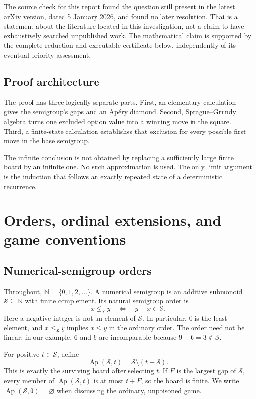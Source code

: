 \documentclass[11pt,letterpaper]{article}
\numberwithin{equation}{section}
\theoremstyle{definition}
\newcommand{\N}{\mathbb N}
\newcommand{\Sg}{\mathcal S}
\newcommand{\Ap}{\operatorname{Ap}}
\begin{document}
The source check for this report found the question still present in the
latest arXiv version, dated 5 January 2026, and found no later resolution.
That is a statement about the literature located in this investigation,
not a claim to have exhaustively searched unpublished work. The mathematical
claim is supported by the complete reduction and executable certificate
below, independently of its eventual priority assessment.

\subsection{Proof architecture}

The proof has three logically separate parts. First, an elementary
calculation gives the semigroup's gaps and an Ap\'ery diamond. Second,
Sprague--Grundy algebra turns one excluded option value into a winning move
in the square. Third, a finite-state calculation establishes that exclusion
for every possible first move in the base semigroup.

The infinite conclusion is not obtained by replacing a sufficiently large
finite board by an infinite one. No such approximation is used. The only
limit argument is the induction that follows an exactly repeated state of
a deterministic recurrence.

\section{Orders, ordinal extensions, and game conventions}
\label{sec:objects}

\subsection{Numerical-semigroup orders}

Throughout, $\N=\{0,1,2,\ldots\}$. A numerical semigroup is an additive
submonoid $\Sg\subseteq\N$ with finite complement. Its natural semigroup
order is
\begin{equation}\label{eq:semigroup-order}
 x\leq_{\Sg}y\quad\Longleftrightarrow\quad y-x\in\Sg.
\end{equation}
Here a negative integer is not an element of $\Sg$. In particular, $0$ is the
least element, and $x\leq_{\Sg}y$ implies $x\leq y$ in the ordinary order.
The order need not be linear: in our example, $6$ and $9$ are incomparable
because $9-6=3\notin\Sg$.

For positive $t\in\Sg$, define
\begin{equation}\label{eq:apery}
 \Ap(\Sg,t)=\Sg\setminus(t+\Sg).
\end{equation}
This is exactly the surviving board after selecting $t$. If $F$ is the
largest gap of $\Sg$, every member of $\Ap(\Sg,t)$ is at most $t+F$, so the
board is finite. We write $\Ap(\Sg,0)=\varnothing$ when discussing the
ordinary, unpoisoned game.
\end{document}
